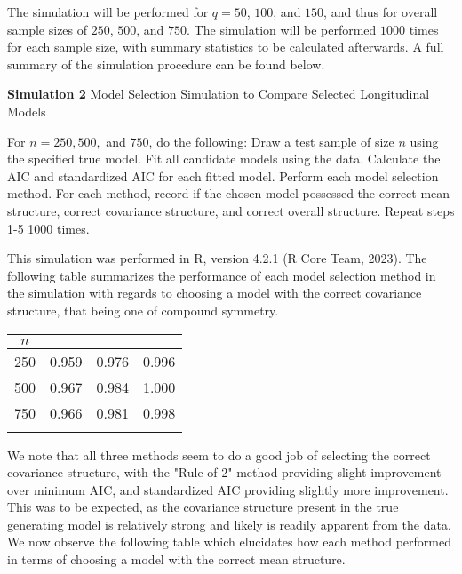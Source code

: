 		The simulation will be performed for $q = 50$, $100$, and $150$, and thus for overall sample sizes of $250$, $500$, and $750$. The simulation will be performed $1000$ times for each sample size,
		with summary statistics to be calculated afterwards. A full summary of the simulation procedure can be found below.
		\begin{algorithm}[H]
			\caption*{\textbf{Simulation 2} Model Selection Simulation to Compare Selected Longitudinal Models}
			\begin{algorithmic}[1]
			  \Statex For $n = 250, 500,$ and $750$, do the following:
			  \State Draw a test sample of size $n$ using the specified true model.
			  \State Fit all candidate models using the data.
			  \State Calculate the AIC and standardized AIC for each fitted model.
			  \State Perform each model selection method.
			  \State For each method, record if the chosen model possessed the correct mean structure, correct covariance structure, and correct overall structure.
			  \State Repeat steps 1-5 1000 times.
			\end{algorithmic}
		\end{algorithm}

		This simulation was performed in R, version 4.2.1 (R Core Team, 2023). The following table summarizes the performance of each model selection method in the simulation with
		regards to choosing a model with the correct covariance structure, that being one of compound symmetry.

		\begin{table}[H]
			\centering
			\small\addtolength{\tabcolsep}{-3pt}
			\setlength\extrarowheight{-3pt}
			{
			\begin{tabular}{ c|c|c|c}
			$n$ & \vtop{\hbox{\strut Minimum AIC}\hbox{\strut Accuracy}} & \vtop{\hbox{\strut AIC Rule of 2}\hbox{\strut Accuracy}} & \vtop{\hbox{\strut Standardized AIC}\hbox{\strut Accuracy}} \\
			 \hline
			 250 & 0.959  &  0.976 &  0.996 \\
			 500 & 0.967  &  0.984 &  1.000 \\
			 750 & 0.966  &  0.981 &  0.998 \\
			 \Xhline{3\arrayrulewidth}
			\end{tabular}
			}
		\end{table}

		We note that all three methods seem to do a good job of selecting the correct covariance structure, with the "Rule of 2" method providing slight improvement over minimum AIC, and
		standardized AIC providing slightly more improvement. This was to be expected, as the covariance structure present in the true generating model is relatively strong and likely
		is readily apparent from the data. We now observe the following table which elucidates how each method performed in terms of choosing a model with the correct mean structure.

